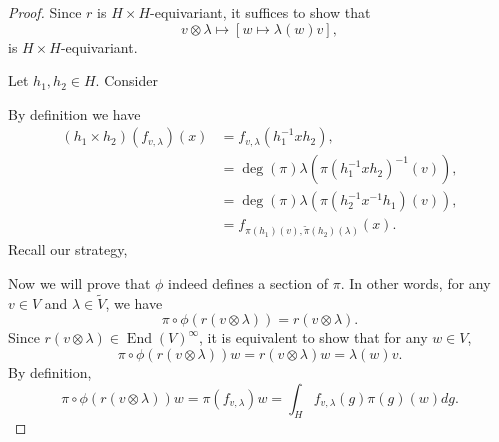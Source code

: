 \documentclass[8pt]{article}
\DeclareMathOperator{\End}{End}
\newcommand{\C}[0]{\mathbb{C}}
\newcommand{\hecke}[0]{\mathscr{H}}
\begin{document}
\begin{proof}
  Since $r$ is $H\times H$-equivariant, it suffices to show that 
  \begin{equation*}
    v\otimes \lambda\mapsto[w\mapsto\lambda(w)v],
  \end{equation*}
  is $H\times H$-equivariant.
  \par Let $h_1,h_2\in H$. Consider 
  \begin{center}
  \end{center}
  By definition we have 
  \begin{align*}
    (h_1\times h_2)(f_{v,\lambda})(x) &= f_{v,\lambda}(h^{-1}_1xh_2),\\
    & = \deg(\pi)\lambda(\pi(h_1^{-1}xh_2)^{-1}(v)),\\
    & = \deg(\pi)\lambda(\pi(h_2^{-1} x^{-1}h_1)(v)),\\
    & = f_{\pi(h_1)(v),\widetilde{\pi}(h_2)(\lambda)}(x).
  \end{align*}
  Recall our strategy,
  \begin{center}
  \end{center}
  Now we will prove that $\phi$ indeed defines a section of $\pi$. In other words, for any $v\in V$ and $\lambda\in\widetilde{V}$, we have 
  \begin{equation*}
    \pi\circ\phi(r(v\otimes\lambda)) = r(v\otimes \lambda).
  \end{equation*}
  Since $r(v\otimes \lambda)\in\End(V)^\infty$, it is equivalent to show that for any $w\in V$, 
  \begin{equation*}
    \pi\circ\phi(r(v\otimes\lambda))w = r(v\otimes\lambda)w = \lambda(w)v.
  \end{equation*}
  By definition, 
  \begin{equation*}
    \pi\circ\phi(r(v\otimes\lambda))w = \pi(f_{v,\lambda})w = \int_Hf_{v,\lambda}(g)\pi(g)(w)dg.

\end{equation*}
\end{proof}
\end{document}
